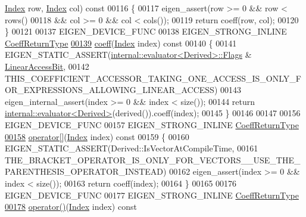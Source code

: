 \begin{DoxyCode}
      \hyperlink{group___core___module_a554f30542cc2316add4b1ea0a492ff02}{Index} row, \hyperlink{group___core___module_a554f30542cc2316add4b1ea0a492ff02}{Index} col)\textcolor{keyword}{ const}
00116 \textcolor{keyword}{    }\{
00117       eigen\_assert(row >= 0 && row < rows()
00118           && col >= 0 && col < cols());
00119       \textcolor{keywordflow}{return} coeff(row, col);
00120     \}
00121 
00137     EIGEN\_DEVICE\_FUNC
00138     EIGEN\_STRONG\_INLINE \hyperlink{class_eigen_1_1internal_1_1_tensor_lazy_evaluator_writable}{CoeffReturnType}
\hyperlink{group___core___module_ad52344ad1f42852db71996590d2de0de}{00139}     \hyperlink{group___core___module_ad52344ad1f42852db71996590d2de0de}{coeff}(\hyperlink{group___core___module_a554f30542cc2316add4b1ea0a492ff02}{Index} index)\textcolor{keyword}{ const}
00140 \textcolor{keyword}{    }\{
00141       EIGEN\_STATIC\_ASSERT(\hyperlink{struct_eigen_1_1internal_1_1evaluator}{internal::evaluator<Derived>::Flags} & 
      \hyperlink{group__flags_ga4b983a15d57cd55806df618ac544d09e}{LinearAccessBit},
00142                           
      THIS\_COEFFICIENT\_ACCESSOR\_TAKING\_ONE\_ACCESS\_IS\_ONLY\_FOR\_EXPRESSIONS\_ALLOWING\_LINEAR\_ACCESS)
00143       eigen\_internal\_assert(index >= 0 && index < size());
00144       \textcolor{keywordflow}{return} \hyperlink{struct_eigen_1_1internal_1_1evaluator}{internal::evaluator<Derived>}(derived()).coeff(index);
00145     \}
00146 
00147 
00156     EIGEN\_DEVICE\_FUNC
00157     EIGEN\_STRONG\_INLINE \hyperlink{class_eigen_1_1internal_1_1_tensor_lazy_evaluator_writable}{CoeffReturnType}
\hyperlink{group___core___module_ad26422dfa7b2bf859d4304663c36de10}{00158}     \hyperlink{group___core___module_ad26422dfa7b2bf859d4304663c36de10}{operator[]}(\hyperlink{group___core___module_a554f30542cc2316add4b1ea0a492ff02}{Index} index)\textcolor{keyword}{ const}
00159 \textcolor{keyword}{    }\{
00160       EIGEN\_STATIC\_ASSERT(Derived::IsVectorAtCompileTime,
00161                           THE\_BRACKET\_OPERATOR\_IS\_ONLY\_FOR\_VECTORS\_\_USE\_THE\_PARENTHESIS\_OPERATOR\_INSTEAD)
00162       eigen\_assert(index >= 0 && index < size());
00163       \textcolor{keywordflow}{return} coeff(index);
00164     \}
00165 
00176     EIGEN\_DEVICE\_FUNC
00177     EIGEN\_STRONG\_INLINE \hyperlink{class_eigen_1_1internal_1_1_tensor_lazy_evaluator_writable}{CoeffReturnType}
\hyperlink{group___core___module_a679c7e69917baa1abf2c2f82725ae470}{00178}     \hyperlink{group___core___module_a679c7e69917baa1abf2c2f82725ae470}{operator()}(\hyperlink{group___core___module_a554f30542cc2316add4b1ea0a492ff02}{Index} index)\textcolor{keyword}{ const}

\end{DoxyCode}
